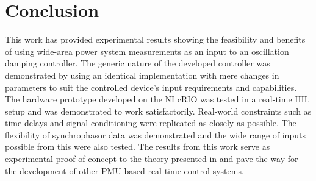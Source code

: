 \documentclass{ieeeaccess}
\begin{document}
\section{Conclusion}\label{Conclusion}
This work has provided experimental results showing the feasibility and benefits of using wide-area power system measurements as an input to an oscillation damping controller. The generic nature of the developed controller was demonstrated by using an identical implementation with mere changes in parameters to suit the controlled device's input requirements and capabilities. The hardware prototype developed on the NI cRIO was tested in a real-time HIL setup and was demonstrated to work satisfactorily. Real-world constraints such as time delays and signal conditioning were replicated as closely as possible. The flexibility of synchrophasor data was demonstrated and the wide range of inputs possible from this were also tested. The results from this work serve as experimental proof-of-concept to the theory presented in \cite{Yuwa} and pave the way for the development of other PMU-based real-time control systems.
\end{document}
